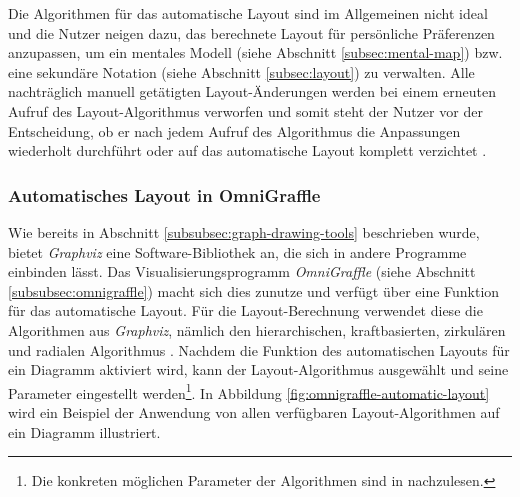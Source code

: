 Die Algorithmen für das automatische Layout sind im Allgemeinen nicht ideal und die Nutzer neigen dazu, das berechnete Layout für persönliche Präferenzen anzupassen, um ein mentales Modell (siehe Abschnitt \ref{subsec:mental-map}) bzw. eine sekundäre Notation (siehe Abschnitt \ref{subsec:layout}) zu verwalten. Alle nachträglich manuell getätigten Layout-Änderungen werden bei einem erneuten Aufruf des Layout-Algorithmus verworfen und somit steht der Nutzer vor der Entscheidung, ob er nach jedem Aufruf des Algorithmus die Anpassungen wiederholt durchführt oder auf das automatische Layout komplett verzichtet \cite[S.119ff]{Eiglsperger04Automatic}.

\subsubsection{Automatisches Layout in OmniGraffle}
\label{subsubsec:omnigraffle-auto-layout}

Wie bereits in Abschnitt \ref{subsubsec:graph-drawing-tools} beschrieben wurde, bietet \textit{Graphviz} eine Software-Bibliothek an, die sich in andere Programme einbinden lässt. Das Visualisierungsprogramm \textit{OmniGraffle} (siehe Abschnitt \ref{subsubsec:omnigraffle}) macht sich dies zunutze und verfügt über eine Funktion für das automatische Layout. Für die Layout-Berechnung verwendet diese die Algorithmen aus \textit{Graphviz}, nämlich den hierarchischen, kraftbasierten, zirkulären und radialen Algorithmus \cite{Olsen10OmniGraffle}. Nachdem die Funktion des automatischen Layouts für ein Diagramm aktiviert wird, kann der Layout-Algorithmus ausgewählt und seine Parameter eingestellt werden\footnote{Die konkreten möglichen Parameter der Algorithmen sind in \cite[S.74]{08OmniGraffle} nachzulesen.}. In Abbildung \ref{fig:omnigraffle-automatic-layout} wird ein Beispiel der Anwendung von allen verfügbaren Layout-Algorithmen auf ein Diagramm illustriert.

